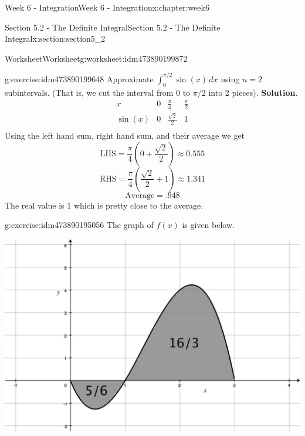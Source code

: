 \documentclass[oneside,10pt,]{book}
\newcommand{\blocktitlefont}{\relax}
\numberwithin{equation}{section}
\newcommand{\amp}{&}
\begin{document}
\begin{chapterptx}{Week 6 - Integration}{}{Week 6 - Integration}{}{}{x:chapter:week6}
\begin{sectionptx}{Section 5.2 - The Definite Integral}{}{Section 5.2 - The Definite Integral}{}{}{x:section:section5_2}
%
\begin{worksheet-subsection}{Worksheet}{}{Worksheet}{}{}{g:worksheet:idm473890199872}
\begin{divisionexercise}{1}{}{}{g:exercise:idm473890199648}%
Approximate \(\displaystyle \int_0^{\pi/2} \sin(x) \, dx\) using \(n=2\) subintervals. (That is, we cut the interval from \(0\) to \(\pi/2\) into 2 pieces).%
\textbf{\blocktitlefont Solution}.\hypertarget{g:solution:idm473890199520}{}\quad{}%
\begin{equation*}
\begin{matrix} 
x \amp 0 \amp \frac{\pi}{4} \amp \frac{\pi}{2} \\
\sin(x) \amp 0 \amp \frac{\sqrt 2}{2} \amp 1 \\
\end{matrix}
\end{equation*}
Using the left hand sum, right hand sum, and their average we get%
\begin{equation*}
\text{LHS} = \frac{\pi}{4}\left( 0 + \frac {\sqrt 2} {2} \right) \approx 0.555
\end{equation*}
%
\begin{equation*}
\text{RHS} = \frac{\pi}{4}\left( \frac {\sqrt 2} {2} +1 \right) \approx 1.341
\end{equation*}
%
\begin{equation*}
\text{Average} = .948 
\end{equation*}
The real value is 1 which is pretty close to the average.%
\end{divisionexercise}%
\begin{divisionexercise}{2}{}{}{g:exercise:idm473890195056}%
The graph of \(f(x)\) is given below.%
\begin{image}{0}{1}{0}%
\includegraphics[width=\linewidth]{images/Math140S14Wksht19G1.jpg}

\end{image}
\end{divisionexercise}
\end{worksheet-subsection}
\end{sectionptx}
\end{chapterptx}
\end{document}
